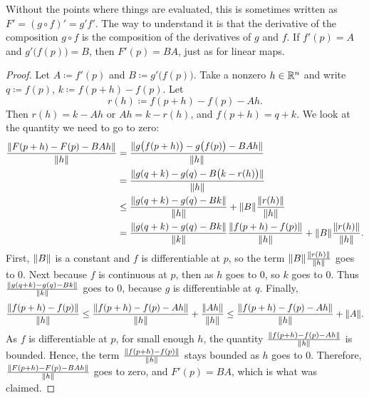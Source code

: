 Without the points where things are evaluated, this is sometimes written as
$F' = {(g \circ f)}' = g' f'$.  The way to
understand it is that the derivative of the composition $g \circ f$
is the composition of the derivatives of $g$ and $f$.  If
$f'(p) = A$ and $g'\bigl(f(p)\bigr) = B$, then $F'(p) = BA$,
just as for linear maps.

\begin{proof}
Let $A \coloneqq f'(p)$ and $B \coloneqq g'\bigl(f(p)\bigr)$.  Take a nonzero $h \in {\mathbb{R}}^n$
and write $q \coloneqq f(p)$, $k \coloneqq f(p+h)-f(p)$.  Let
\begin{equation*}
r(h) \coloneqq f(p+h)-f(p) - A h . %
\end{equation*}
Then $r(h) = k-Ah$ or $Ah = k-r(h)$, and $f(p+h) = q+k$.
We look at the quantity we need to go
to zero:
\begin{equation*}
\begin{split}
\frac{\lVert {F(p+h)-F(p) - BAh} \rVert}{\lVert {h} \rVert}
& =
\frac{\lVert {g\bigl(f(p+h)\bigr)-g\bigl(f(p)\bigr) - BAh} \rVert}{\lVert {h} \rVert}
\\
& =
\frac{\lVert {g(q+k)-g(q) - B\bigl(k-r(h)\bigr)} \rVert}{\lVert {h} \rVert}
\\
& \leq
\frac
{\lVert {g(q+k)-g(q) - Bk} \rVert}
{\lVert {h} \rVert}
+
\lVert {B} \rVert
\frac
{\lVert {r(h)} \rVert}
{\lVert {h} \rVert}
\\
& =
\frac
{\lVert {g(q+k)-g(q) - Bk} \rVert}
{\lVert {k} \rVert}
\frac
{\lVert {f(p+h)-f(p)} \rVert}
{\lVert {h} \rVert}
+
\lVert {B} \rVert
\frac
{\lVert {r(h)} \rVert}
{\lVert {h} \rVert} .
\end{split}
\end{equation*}
First, $\lVert {B} \rVert$ is a constant and $f$ is differentiable at $p$,
so
the term $\lVert {B} \rVert\frac{\lVert {r(h)} \rVert}{\lVert {h} \rVert}$ goes to 0.
Next because $f$ is continuous at $p$, then as
$h$ goes to 0, so $k$ goes to 0.  Thus
$\frac
{\lVert {g(q+k)-g(q) - Bk} \rVert}
{\lVert {k} \rVert}$ goes to 0, because $g$ is differentiable at $q$.
Finally,
\begin{equation*}
\frac
{\lVert {f(p+h)-f(p)} \rVert}
{\lVert {h} \rVert}
\leq
\frac
{\lVert {f(p+h)-f(p)-Ah} \rVert}
{\lVert {h} \rVert}
+
\frac
{\lVert {Ah} \rVert}
{\lVert {h} \rVert}
\leq
\frac
{\lVert {f(p+h)-f(p)-Ah} \rVert}
{\lVert {h} \rVert}
+
\lVert {A} \rVert .
\end{equation*}
As $f$ is differentiable at $p$,
for small enough $h$, the quantity
$\frac{\lVert {f(p+h)-f(p)-Ah} \rVert}{\lVert {h} \rVert}$ is bounded.  Hence, the
term
$
\frac
{\lVert {f(p+h)-f(p)} \rVert}
{\lVert {h} \rVert}
$
stays bounded as $h$ goes to 0.  Therefore, 
$\frac{\lVert {F(p+h)-F(p) - BAh} \rVert}{\lVert {h} \rVert}$ goes to zero, and
$F'(p) = BA$, which is what was claimed.
\end{proof}

